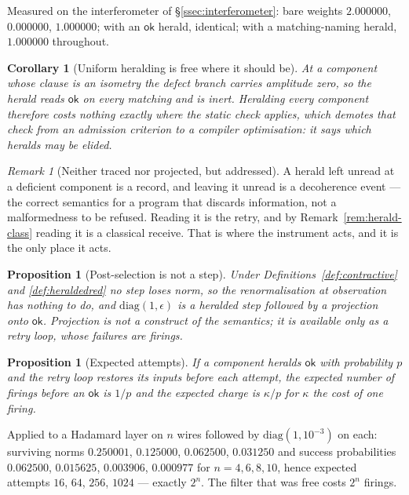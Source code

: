 \documentclass[11pt,a4paper]{article}
\theoremstyle{plain}
\newtheorem{proposition}[theorem]{Proposition}
\newtheorem{corollary}[theorem]{Corollary}
\theoremstyle{definition}
\theoremstyle{remark}
\newtheorem{remark}[theorem]{Remark}
\begin{document}
Measured on the interferometer of \S\ref{ssec:interferometer}: bare weights
$2.000000$, $0.000000$, $1.000000$; with an $\mathsf{ok}$ herald, identical;
with a matching-naming herald, $1.000000$ throughout.

\begin{corollary}[Uniform heralding is free where it should be]\label{cor:inert}
At a component whose clause is an isometry the defect branch carries amplitude
zero, so the herald reads $\mathsf{ok}$ on every matching and is inert. Heralding
every component therefore costs nothing exactly where the static check applies,
which demotes that check from an admission criterion to a compiler optimisation:
it says which heralds may be elided.
\end{corollary}

\begin{remark}[Neither traced nor projected, but addressed]\label{rem:uncompute}
A herald left unread at a deficient component is a record, and leaving it unread
is a decoherence event --- the correct semantics for a program that discards
information, not a malformedness to be refused. Reading it is the retry, and by
Remark~\ref{rem:herald-class} reading it is a classical receive. That is where
the instrument acts, and it is the only place it acts.
\end{remark}

\begin{proposition}[Post-selection is not a step]\label{prop:nopostsel}
Under Definitions~\ref{def:contractive} and \ref{def:heraldedred} no step loses
norm, so the renormalisation at observation has nothing to do, and
$\mathrm{diag}(1,\epsilon)$ is a heralded step followed by a projection onto
$\mathsf{ok}$. Projection is not a construct of the semantics; it is available
only as a retry loop, whose failures are firings.
\end{proposition}

\begin{proposition}[Expected attempts]\label{prop:attempts}
If a component heralds $\mathsf{ok}$ with probability $p$ and the retry loop
restores its inputs before each attempt, the expected number of firings before
an $\mathsf{ok}$ is $1/p$ and the expected charge is $\kappa/p$ for $\kappa$ the
cost of one firing.
\end{proposition}

Applied to a Hadamard layer on $n$ wires followed by $\mathrm{diag}(1,10^{-3})$
on each: surviving norms $0.250001$, $0.125000$, $0.062500$, $0.031250$ and
success probabilities $0.062500$, $0.015625$, $0.003906$, $0.000977$ for
$n = 4,6,8,10$, hence expected attempts $16$, $64$, $256$, $1024$ --- exactly
$2^{n}$. The filter that was free costs $2^n$ firings.
\end{document}
